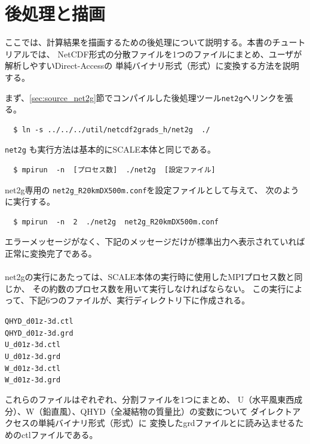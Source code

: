 \section{後処理と描画} \label{sec:ideal_exp_net2g}
ここでは、計算結果を描画するための後処理について説明する。本書のチュートリアルでは、
NetCDF形式の分散ファイルを1つのファイルにまとめ、ユーザが解析しやすいDirect-Accessの
単純バイナリ形式（\grads 形式）に変換する方法を説明する。

まず、\ref{sec:source_net2g}節でコンパイルした後処理ツール\verb|net2g|へリンクを張る。
\begin{verbatim}
  $ ln -s ../../../util/netcdf2grads_h/net2g  ./
\end{verbatim}

\verb|net2g| も実行方法は基本的にSCALE本体と同じである。
\begin{verbatim}
  $ mpirun  -n  [プロセス数]  ./net2g  [設定ファイル]
\end{verbatim}
net2g専用の \verb|net2g_R20kmDX500m.conf|を設定ファイルとして与えて、
次のように実行する。
\begin{verbatim}
  $ mpirun  -n  2  ./net2g  net2g_R20kmDX500m.conf
\end{verbatim}
エラーメッセージがなく、下記のメッセージだけが標準出力へ表示されていれば正常に変換完了である。\\

\\

\noindent net2gの実行にあたっては、SCALE本体の実行時に使用したMPIプロセス数と同じか、
その約数のプロセス数を用いて実行しなければならない。
この実行によって、下記6つのファイルが、実行ディレクトリ下に作成される。
\begin{alltt}
  QHYD_d01z-3d.ctl
  QHYD_d01z-3d.grd
  U_d01z-3d.ctl
  U_d01z-3d.grd
  W_d01z-3d.ctl
  W_d01z-3d.grd
\end{alltt}
これらのファイルはぞれぞれ、分割ファイルを1つにまとめ、
U（水平風東西成分）、W（鉛直風）、QHYD（全凝結物の質量比）の変数について
ダイレクトアクセスの単純バイナリ形式（\grads 形式）に
変換したgrdファイルと\grads に読み込ませるためのctlファイルである。

